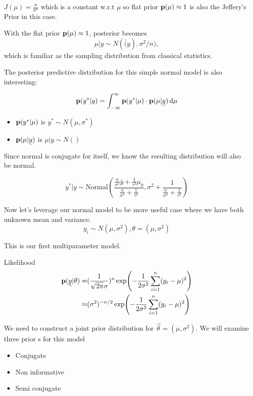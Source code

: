 $J(\mu) = \frac{n}{\sigma^2}$ which is a constant w.r.t $\mu$ so flat prior ${\mathbf p}(\mu) \approx 1$ is also the Jeffery's Prior in this case.

With the flat prior ${\mathbf p}(\mu) \approx 1$, posterior becomes
\[
\mu | y \sim N(\bar(y), \sigma^2/n),
\]
which is familiar as the sampling distribution from classical statistics.

The posterior predictive distribution for this simple normal model is also interesting:

\[
\p(y^*| y) = \int_{-\infty}^{\infty} \p(y^*| \mu) \cdot \p(\mu| \vec{y}) \diff \mu 
\]

\begin{itemize}
    \item ${\mathbf p}(y^*| \mu)$ is $y^* \sim N(\mu, \sigma^*)$
    \item $\p(\mu| \vec{y})$ is $\mu|y \sim N()$
\end{itemize}

Since normal is conjugate for itself, we know the resulting distribution will also be normal.

\[
y^*|y \sim \text{Normal}(
\frac{\frac{n}{\sigma^2} \bar{y} + \frac{1}{\tau^2} \mu_0}{ \frac{n}{\sigma^2} + \frac{1}{\tau^2}},
\sigma^2 + \frac{1}{\frac{n}{\sigma^2} + \frac{1}{\tau^2}})
\]

Now let's leverage our normal model to be more useful case where we have both unknown mean and variance.
\[
y_i \sim N(\mu, \sigma^2), \theta = (\mu, \sigma^2)
\]

This is our first multiparameter model.

Likelihood
\begin{align*}
    \p(\vec{y}| \theta) 
    =& (\frac{1}{\sqrt{2\pi}\sigma})^n \exp(-\frac{1}{2\sigma^2} \sum_{i=1}^n(y_i - \mu)^2)\\
    \approx& (\sigma^2)^{-n/2} \exp(-\frac{1}{2\sigma^2} \sum_{i=1}^n(y_i - \mu)^2)
\end{align*}

We need to construct a joint prior distribution for $\vec{\theta} = (\mu, \sigma^2)$. We will examine three prior s for this model
\begin{itemize}
    \item Conjugate
    \item Non informative
    \item Semi conjugate
\end{itemize}